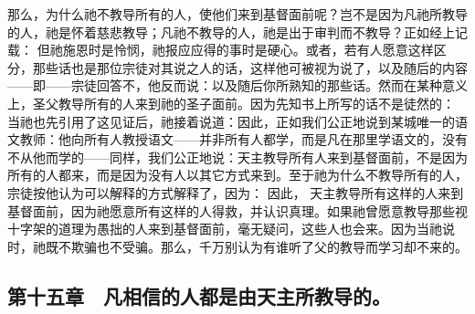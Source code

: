 那么，为什么祂不教导所有的人，使他们来到基督面前呢？岂不是因为凡祂所教导的人，祂是怀着慈悲教导；凡祂不教导的人，祂是出于审判而不教导？正如经上记载： 但祂施恩时是怜悯，祂报应应得的事时是硬心。或者，若有人愿意这样区分，那些话也是那位宗徒对其说之人的话，这样他可被视为说了，以及随后的内容——即——宗徒回答不，他反而说：以及随后你所熟知的那些话。然而在某种意义上，圣父教导所有的人来到祂的圣子面前。因为先知书上所写的话不是徒然的： 当祂也先引用了这见证后，祂接着说道：因此，正如我们公正地说到某城唯一的语文教师：他向所有人教授语文——并非所有人都学，而是凡在那里学语文的，没有不从他而学的——同样，我们公正地说：天主教导所有人来到基督面前，不是因为所有的人都来，而是因为没有人以其它方式来到。至于祂为什么不教导所有的人，宗徒按他认为可以解释的方式解释了，因为： 因此， 天主教导所有这样的人来到基督面前，因为祂愿意所有这样的人得救，并认识真理。如果祂曾愿意教导那些视十字架的道理为愚拙的人来到基督面前，毫无疑问，这些人也会来。因为当祂说时，祂既不欺骗也不受骗。那么，千万别认为有谁听了父的教导而学习却不来的。\par


\subsection{第十五章　凡相信的人都是由天主所教导的。}

